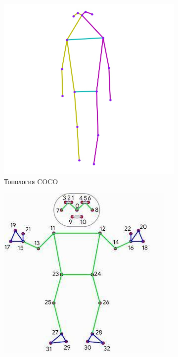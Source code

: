 \begin{figure}[h]
\begin{subfigure}[b]{.3\textwidth}
	\centering
	\includegraphics[width=\textwidth]{./images/COCO_topology.jpg}
	\caption{Топология COCO}
	\label{fig:COCO_topology}
\end{subfigure}
\begin{subfigure}[b]{.3\textwidth}
	\centering
    \includegraphics[width=\textwidth]{./images/BlazePose_topology.jpg}

\end{subfigure}
\end{figure}
